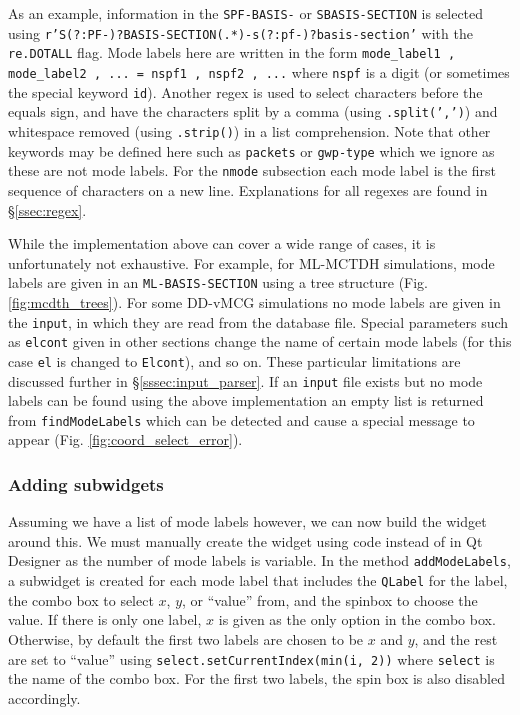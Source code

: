 \documentclass[12pt]{article}
\begin{document}
As an example, information in the \texttt{SPF-BASIS-} or \texttt{SBASIS-SECTION} is selected using \texttt{r'S(?:PF-)?BASIS-SECTION\s*\n(.*)\nend-s(?:pf-)?basis-section'} with the \texttt{re.DOTALL} flag. Mode labels here are written in the form \texttt{mode\_label1 , mode\_label2 , ... = nspf1 , nspf2 , ...} where \texttt{nspf} is a digit (or sometimes the special keyword \texttt{id}). Another regex is used to select characters before the equals sign, and have the characters split by a comma (using \texttt{.split(',')}) and whitespace removed (using \texttt{.strip()}) in a list comprehension. Note that other keywords may be defined here such as \texttt{packets} or \texttt{gwp-type} which we ignore as these are not mode labels. For the \texttt{nmode} subsection each mode label is the first sequence of characters on a new line. Explanations for all regexes are found in \S\ref{ssec:regex}.

While the implementation above can cover a wide range of cases, it is unfortunately not exhaustive. For example, for ML-MCTDH simulations, mode labels are given in an \texttt{ML-BASIS-SECTION} using a tree structure (Fig. \ref{fig:mcdth_trees}). For some DD-vMCG simulations no mode labels are given in the \texttt{input}, in which they are read from the database file. Special parameters such as \texttt{elcont} given in other sections change the name of certain mode labels (for this case \texttt{el} is changed to \texttt{Elcont}), and so on. These particular limitations are discussed further in \S\ref{sssec:input_parser}. If an \texttt{input} file exists but no mode labels can be found using the above implementation an empty list is returned from \texttt{findModeLabels} which can be detected and cause a special message to appear (Fig. \ref{fig:coord_select_error}).

\subsubsection{Adding subwidgets}

Assuming we have a list of mode labels however, we can now build the widget around this. We must manually create the widget using code instead of in Qt Designer as the number of mode labels is variable. In the method \texttt{addModeLabels}, a subwidget is created for each mode label that includes the \texttt{QLabel} for the label, the combo box to select \(x\), \(y\), or ``value'' from, and the spinbox to choose the value. If there is only one label, \(x\) is given as the only option in the combo box. Otherwise, by default the first two labels are chosen to be \(x\) and \(y\), and the rest are set to ``value'' using \texttt{select.setCurrentIndex(min(i, 2))} where \texttt{select} is the name of the combo box. For the first two labels, the spin box is also disabled accordingly.
\end{document}
